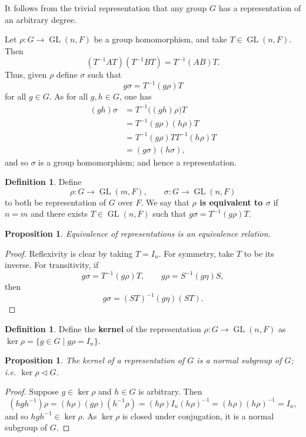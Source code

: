 \documentclass[11pt, notitlepage]{article}
\numberwithin{equation}{section}
\theoremstyle{plain}
\newtheorem{proposition}[theorem]{Proposition}
\theoremstyle{definition}
\newtheorem{definition}[theorem]{Definition}
\DeclareMathOperator{\GL}{GL}
\begin{document}
It follows from the trivial representation that any group $G$ has a representation of an arbitrary degree.

Let $\rho : G \to \GL(n,F)$ be a group homomorphism, and take $T \in \GL(n,F)$. Then
\[
    (T^{-1}AT)(T^{-1}BT) = T^{-1}(AB)T.
\]
Thus, given $\rho$ define $\sigma$ such that
\[
    g\sigma = T^{-1}(g\rho)T
\]
for all $g \in G$. As for all $g,h \in G$, one has
\begin{align*}
    (gh)\sigma &= T^{-1}\big((gh)\rho\big)T\\
    &= T^{-1}(g\rho)(h\rho)T\\
    &= T^{-1}(g\rho)TT^{-1}(h\rho)T\\
    &= (g\sigma)(h\sigma),
\end{align*}
and so $\sigma$ is a group homomorphism; and hence a representation.

\begin{definition}
Define
\[
    \rho : G \to \GL(m,F), \qquad \sigma : G \to \GL(n,F)
\]
to both be representation of $G$ over $F$. We say that \textbf{$\rho$ is equivalent to $\sigma$} if $n=m$ and there exists $T \in \GL(n,F)$ such that $g\sigma = T^{-1}(g\rho)T$.
\end{definition}

\begin{proposition}
Equivalence of representations is an equivalence relation.
\end{proposition}

\begin{proof}
Reflexivity is clear by taking $T = I_n$. For symmetry, take $T$ to be its inverse. For transitivity, if
\[
    g\sigma = T^{-1}(g\rho)T, \qquad g\rho = S^{-1}(g\eta)S,
\]
then
\[
    g\sigma = (ST)^{-1}(g\eta)(ST).
\]
\end{proof}

\begin{definition}
Define the \textbf{kernel} of the representation $\rho : G \to \GL(n,F)$ as $\ker \rho = \{g \in G \mid g\rho = I_n\}$.
\end{definition}

\begin{proposition}
The kernel of a representation of $G$ is a normal subgroup of $G$; i.e. $\ker \rho \lhd G$.
\end{proposition}

\begin{proof}
Suppose $g \in \ker \rho$ and $h \in G$ is arbitrary. Then
\[
    (hgh^{-1})\rho = (h\rho)(g\rho)(h^{-1}\rho) = (h\rho)I_n(h\rho)^{-1} = (h\rho)(h\rho)^{-1} = I_n,
\]
and so $hgh^{-1} \in \ker \rho$. As $\ker \rho$ is closed under conjugation, it is a normal subgroup of $G$.
\end{proof}
\end{document}

